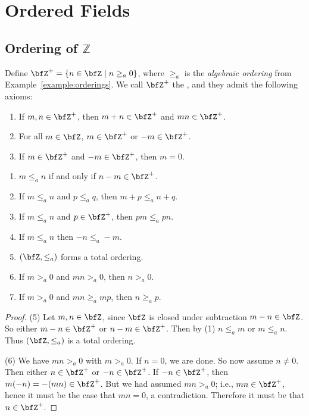 \chapter{Ordered Fields}\label{chapter:ordered Fields}
\vspace{12pt}

\section{Ordering of $\mathbb{Z}$}
    \begin{definition}
        Define $\bfZ^+  = \{n \in \bfZ \mid n \geq_a 0\}$, where $\geq_a$ is the \textit{algebraic ordering} from Example~\ref{example:orderings}. We call $\bfZ^+$ the , and they admit the following axioms:
        \begin{enumerate}[label = (\arabic*)]
            \item If $m,n \in \bfZ^+$, then $m+n \in \bfZ^+$ and $mn \in \bfZ^+$.
            \item For all $m \in \bfZ$, $m \in \bfZ^+$ or $-m \in \bfZ^+$.
            \item If $m \in \bfZ^+$ and $-m \in \bfZ^+$, then $m=0$. 
        \end{enumerate}
    \end{definition}
    
    \begin{proposition}
        \phantom{a}
        \begin{enumerate}[label = (\arabic*)]
            \item $m \leq_a n$ if and only if $n - m \in \bfZ^+$.
            \item If $m \leq_a n$ and $p \leq_a q$, then $m + p \leq_a n + q$.
            \item If $m \leq_a n$ and $p \in \bfZ^+$, then $pm \leq_a pn$.
            \item If $m \leq_a n$ then $-n \leq_a -m$.
            \item $(\bfZ,\leq_a)$ forms a total ordering.
            \item If $m >_a 0$ and $mn >_a 0$, then $n >_a 0$.
            \item If $m >_a 0$ and $mn \geq_a mp$, then $n \geq_a p$.
        \end{enumerate}
    \end{proposition}
        \begin{proof}
            (5) Let $m,n \in \bfZ$, since $\bfZ$ is closed under subtraction $m - n \in \bfZ$. So either $m-n \in \bfZ^+$ or $n - m \in \bfZ^+$. Then by (1) $n \leq_a m$ or $m \leq_a n$. Thus $(\bfZ,\leq_a)$ is a total ordering.

            (6) We have $mn >_a 0 $ with $m >_a 0$. If $n = 0$, we are done. So now assume $n \neq 0$. Then either $n \in \bfZ^+$ or $-n \in \bfZ^+$. If $-n \in \bfZ^+$, then $m(-n) = -(mn) \in \bfZ^+$. But we had assumed $mn >_a 0$; i.e., $mn \in \bfZ^+$, hence it must be the case that $mn = 0$, a contradiction. Therefore it must be that $n \in \bfZ^+$.
        \end{proof}

